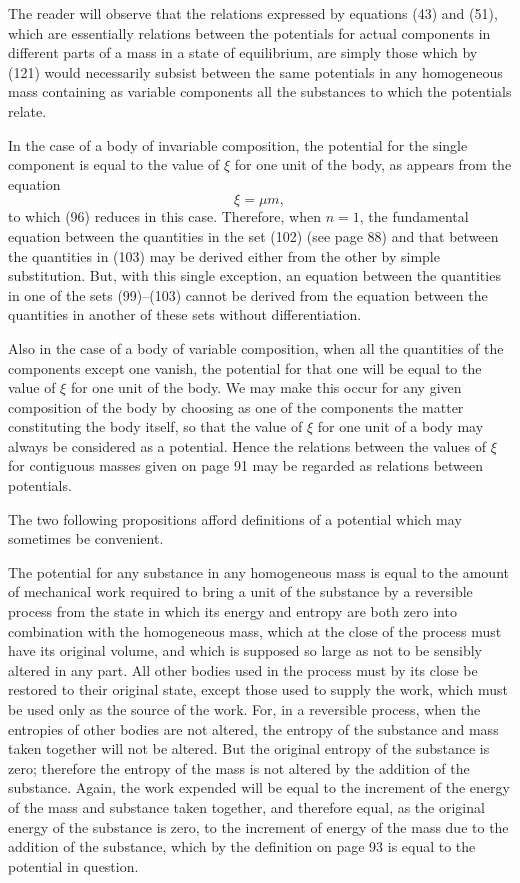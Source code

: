 \documentclass[11pt]{article}
\begin{document}
The reader will observe that the relations expressed by equations (43) and (51), which are essentially relations between the potentials for actual components in different parts of a mass in a state of equilibrium, are simply those which by (121) would necessarily subsist between the same potentials in any homogeneous mass containing as variable components all the substances to which the potentials relate.

In the case of a body of invariable composition, the potential for the single component is equal to the value of \(\xi\) for one unit of the body, as appears from the equation
\begin{equation}
\xi=\mu m,
\end{equation}
to which (96) reduces in this case. Therefore, when \(n=1\), the fundamental equation between the quantities in the set (102) (see page 88) and that between the quantities in (103) may be derived either from the other by simple substitution. But, with this single exception, an equation between the quantities in one of the sets (99)--(103) cannot be derived from the equation between the quantities in another of these sets without differentiation.


Also in the case of a body of variable composition, when all the quantities of the components except one vanish, the potential for that one will be equal to the value of \(\xi\) for one unit of the body. We may make this occur for any given composition of the body by choosing as one of the components the matter constituting the body itself, so that the value of \(\xi\) for one unit of a body may always be considered as a potential. Hence the relations between the values of \(\xi\) for contiguous masses given on page 91 may be regarded as relations between potentials.

The two following propositions afford definitions of a potential which may sometimes be convenient.

The potential for any substance in any homogeneous mass is equal to the amount of mechanical work required to bring a unit of the substance by a reversible process from the state in which its energy and entropy are both zero into combination with the homogeneous mass, which at the close of the process must have its original volume, and which is supposed so large as not to be sensibly altered in any part. All other bodies used in the process must by its close be restored to their original state, except those used to supply the work, which must be used only as the source of the work. For, in a reversible process, when the entropies of other bodies are not altered, the entropy of the substance and mass taken together will not be altered. But the original entropy of the substance is zero; therefore the entropy of the mass is not altered by the addition of the substance. Again, the work expended will be equal to the increment of the energy of the mass and substance taken together, and therefore equal, as the original energy of the substance is zero, to the increment of energy of the mass due to the addition of the substance, which by the definition on page 93 is equal to the potential in question.
\end{document}

